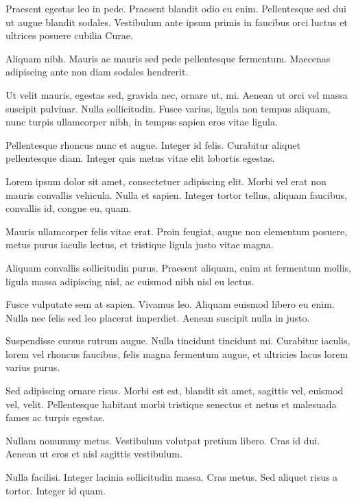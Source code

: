 \documentclass[12pt,reqno,oneside]{amsbook}
\theoremstyle{definition}
\begin{document}
Praesent egestas leo in pede. Praesent blandit odio eu enim. Pellentesque sed dui ut augue blandit sodales. Vestibulum ante ipsum primis in faucibus orci luctus et ultrices posuere cubilia Curae.

Aliquam nibh. Mauris ac mauris sed pede pellentesque fermentum. Maecenas adipiscing ante non diam sodales hendrerit.

Ut velit mauris, egestas sed, gravida nec, ornare ut, mi. Aenean ut orci vel massa suscipit pulvinar. Nulla sollicitudin. Fusce varius, ligula non tempus aliquam, nunc turpis ullamcorper nibh, in tempus sapien eros vitae ligula.

Pellentesque rhoncus nunc et augue. Integer id felis. Curabitur aliquet pellentesque diam. Integer quis metus vitae elit lobortis egestas.

Lorem ipsum dolor sit amet, consectetuer adipiscing elit. Morbi vel erat non mauris convallis vehicula. Nulla et sapien. Integer tortor tellus, aliquam faucibus, convallis id, congue eu, quam.

Mauris ullamcorper felis vitae erat. Proin feugiat, augue non elementum posuere, metus purus iaculis lectus, et tristique ligula justo vitae magna.

Aliquam convallis sollicitudin purus. Praesent aliquam, enim at fermentum mollis, ligula massa adipiscing nisl, ac euismod nibh nisl eu lectus.

Fusce vulputate sem at sapien. Vivamus leo. Aliquam euismod libero eu enim. Nulla nec felis sed leo placerat imperdiet. Aenean suscipit nulla in justo.

Suspendisse cursus rutrum augue. Nulla tincidunt tincidunt mi. Curabitur iaculis, lorem vel rhoncus faucibus, felis magna fermentum augue, et ultricies lacus lorem varius purus.

Sed adipiscing ornare risus. Morbi est est, blandit sit amet, sagittis vel, euismod vel, velit. Pellentesque habitant morbi tristique senectus et netus et malesuada fames ac turpis egestas.

Nullam nonummy metus. Vestibulum volutpat pretium libero. Cras id dui. Aenean ut eros et nisl sagittis vestibulum.

Nulla facilisi. Integer lacinia sollicitudin massa. Cras metus. Sed aliquet risus a tortor. Integer id quam.



\mainmatter

\doublespacing %
\end{document}

